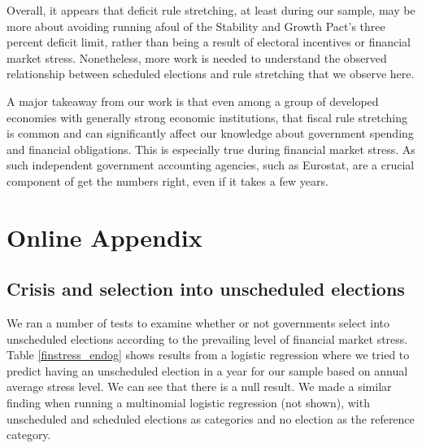 \documentclass[]{article}
\begin{document}
Overall, it appears that deficit rule stretching, at least during our sample, may be more about avoiding running afoul of the Stability and Growth Pact's three percent deficit limit, rather than being a result of electoral incentives or financial market stress. Nonetheless, more work is needed to understand the observed relationship between scheduled elections and rule stretching that we observe here.

A major takeaway from our work is that even among a group of developed economies with generally strong economic institutions, that fiscal rule stretching is common and can significantly affect our knowledge about government spending and financial obligations. This is especially true during financial market stress. As such independent government accounting agencies, such as Eurostat, are a crucial component of get the numbers right, even if it takes a few years.


\clearpage




\pagebreak
\renewcommand{\thepage}{A-\arabic{page}}\setcounter{page}{1}
\renewcommand{\thesection}{Appendix \arabic{section}}\setcounter{section}{0}
\renewcommand{\thetable}{A-\arabic{table}}\setcounter{table}{0}
\renewcommand{\thefigure}{A-\arabic{figure}}\setcounter{figure}{0}
\clearpage

\section*{Online Appendix}

\subsection*{Crisis and selection into unscheduled elections}

We ran a number of tests to examine whether or not governments select into unscheduled elections according to the prevailing level of financial market stress. Table \ref{finstress_endog} shows results from a logistic regression where we tried to predict having an unscheduled election in a year for our sample based on annual average stress level. We can see that there is a null result. We made a similar finding when running a multinomial logistic regression (not shown), with unscheduled and scheduled elections as categories and no election as the reference category.


\end{document}
